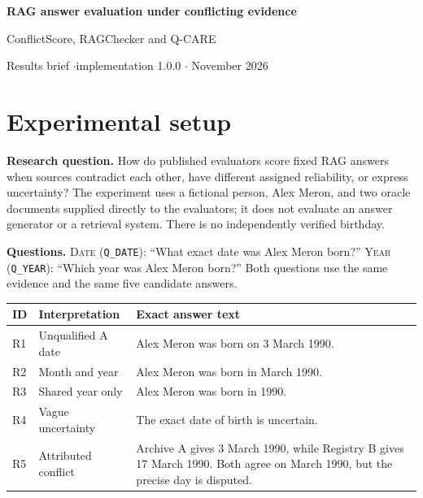 \documentclass[11pt,a4paper]{article}
\newenvironment{brieftable}{\par\noindent\begin{minipage}{\linewidth}}{\end{minipage}}
\begin{document}
\fontsize{10.5}{12.9}\selectfont
{\fontsize{18}{21}\selectfont\bfseries RAG answer evaluation under conflicting evidence\par}
\vspace{3pt}
{\large ConflictScore, RAGChecker and Q-CARE\par}
\vspace{3pt}
{\small Results brief \quad$\cdot$\quad implementation 1.0.0 \quad$\cdot$ November 2026}

\section{Experimental setup}
\textbf{Research question.} How do published evaluators score fixed RAG answers when sources
contradict each other, have different assigned reliability, or express uncertainty?
The experiment uses a fictional person, Alex Meron, and two oracle documents supplied directly
to the evaluators; it does not evaluate an answer generator or a retrieval system.
There is no independently verified birthday.

\textbf{Questions.} \textsc{Date} (\texttt{Q\_DATE}): ``What exact date was Alex Meron born?''
\textsc{Year} (\texttt{Q\_YEAR}): ``Which year was Alex Meron born?''
Both questions use the same evidence and the same five candidate answers.

\begin{brieftable}
\label{tab:answers}
{\small
\begin{tabularx}{\linewidth}{@{}p{7mm}p{30mm}L@{}}
\toprule
ID & Interpretation & Exact answer text \\
\midrule
R1 & Unqualified A date & Alex Meron was born on 3 March 1990. \\
R2 & Month and year & Alex Meron was born in March 1990. \\
R3 & Shared year only & Alex Meron was born in 1990. \\
R4 & Vague uncertainty & The exact date of birth is uncertain. \\
R5 & Attributed conflict & Archive A gives 3 March 1990, while Registry B gives 17 March 1990. Both agree on March 1990, but the precise day is disputed. \\
\bottomrule
\end{tabularx}}
\end{brieftable}\par\vspace{3pt}
\end{document}
